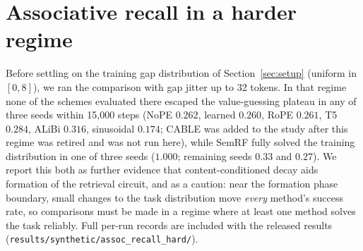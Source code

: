 \documentclass[11pt]{article}
\begin{document}
\section{Associative recall in a harder regime}
\label{app:hard}
Before settling on the training gap distribution of Section~\ref{sec:setup}
(uniform in $[0,8]$), we ran the comparison with gap jitter up to 32
tokens. In that regime none of the schemes evaluated there escaped the
value-guessing plateau in any of three seeds within 15{,}000 steps (NoPE
$0.262$, learned $0.260$, RoPE $0.261$, T5 $0.284$, ALiBi $0.316$, sinusoidal
$0.174$; CABLE was added to the study after this regime was retired and was
not run here), while SemRF fully solved the training distribution in one of
three seeds ($1.000$; remaining seeds $0.33$ and $0.27$). We report this both as further evidence that
content-conditioned decay aids formation of the retrieval circuit, and as a
caution: near the formation phase boundary, small changes to the task
distribution move \emph{every} method's success rate, so comparisons must be
made in a regime where at least one method solves the task reliably. Full
per-run records are included with the released results
(\texttt{results/synthetic/assoc\_recall\_hard/}).
\end{document}
